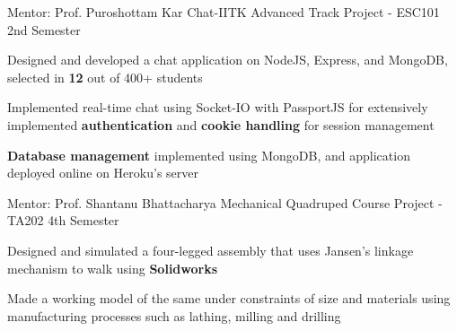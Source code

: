 \begin{cventries}
  \cventry
    {Mentor: Prof. Puroshottam Kar}
    {Chat-IITK}
    {Advanced Track Project - ESC101}
    {2nd Semester}
    {
      \begin{cvitems}
        \item {Designed and developed a chat application on NodeJS, Express, and MongoDB, selected in \textbf{12} out of 400+ students}
        \item {Implemented real-time chat using Socket-IO with PassportJS for extensively implemented \textbf{authentication} and \textbf{cookie handling} for session management}
        \item {\textbf{Database management} implemented using MongoDB, and application deployed online on Heroku's server}
      \end{cvitems}
    }

    \cventry
    {Mentor: Prof. Shantanu Bhattacharya}
    {Mechanical Quadruped}
    {Course Project -TA202}
    {4th Semester}
    {
      \begin{cvitems}
        \item Designed and simulated a four-legged assembly that uses Jansen's linkage mechanism to walk using \textbf{Solidworks}
        \item Made a working model of the same under constraints of size and materials using manufacturing processes such as lathing, milling and drilling
      \end{cvitems}
    } 




\end{cventries}
\vspace{-2mm}

